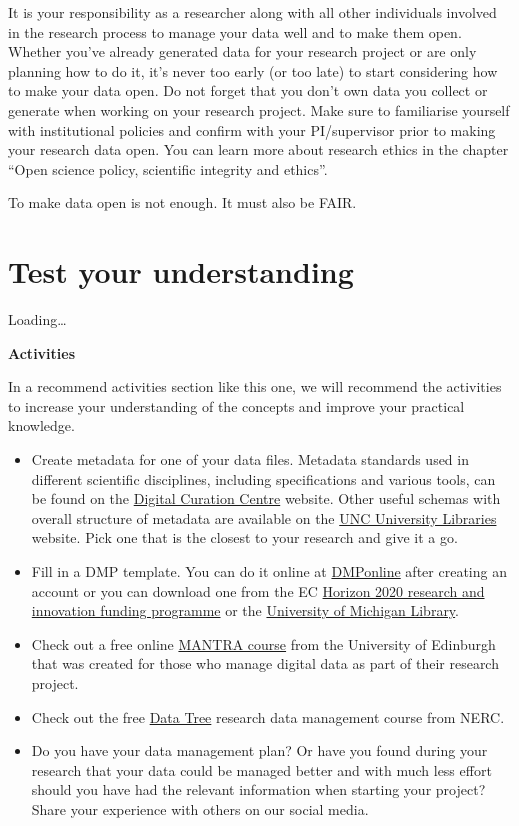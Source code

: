 \documentclass[
]{book}
\begin{document}
It is your responsibility as a researcher along with all other individuals involved in the research process to manage your data well and to make them open. Whether you've already generated data for your research project or are only planning how to do it, it's never too early (or too late) to start considering how to make your data open. Do not forget that you don't own data you collect or generate when working on your research project. Make sure to familiarise yourself with institutional policies and confirm with your PI/supervisor prior to making your research data open. You can learn more about research ethics in the chapter ``Open science policy, scientific integrity and ethics''.

To make data open is not enough. It must also be FAIR.

\hypertarget{test-your-understanding-3}{%
\section{Test your understanding}\label{test-your-understanding-3}}

Loading\ldots{}

\textbf{Activities}

In a recommend activities section like this one, we will recommend the activities to increase your understanding of the concepts and improve your practical knowledge.

\begin{itemize}
\item
  Create metadata for one of your data files. Metadata standards used in different scientific disciplines, including specifications and various tools, can be found on the \href{https://www.dcc.ac.uk/guidance/standards/metadata}{Digital Curation Centre} website. Other useful schemas with overall structure of metadata are available on the \href{https://guides.lib.unc.edu/metadata/standards}{UNC University Libraries} website. Pick one that is the closest to your research and give it a go.
\item
  Fill in a DMP template. You can do it online at \href{https://dmponline.dcc.ac.uk/}{DMPonline} after creating an account or you can download one from the EC \href{https://ec.europa.eu/research/participants/data/ref/h2020/gm/reporting/h2020-tpl-oa-data-mgt-plan_en.docx}{Horizon 2020 research and innovation funding programme} or the \href{https://guides.lib.umich.edu/c.php?g=283277\&p=2138498}{University of Michigan Library}.
\item
  Check out a free online \href{https://mantra.ed.ac.uk/}{MANTRA course} from the University of Edinburgh that was created for those who manage digital data as part of their research project.
\item
  Check out the free \href{https://datatree.org.uk/}{Data Tree} research data management course from NERC.
\item
  Do you have your data management plan? Or have you found during your research that your data could be managed better and with much less effort should you have had the relevant information when starting your project? Share your experience with others on our social media.
\end{itemize}
\end{document}
